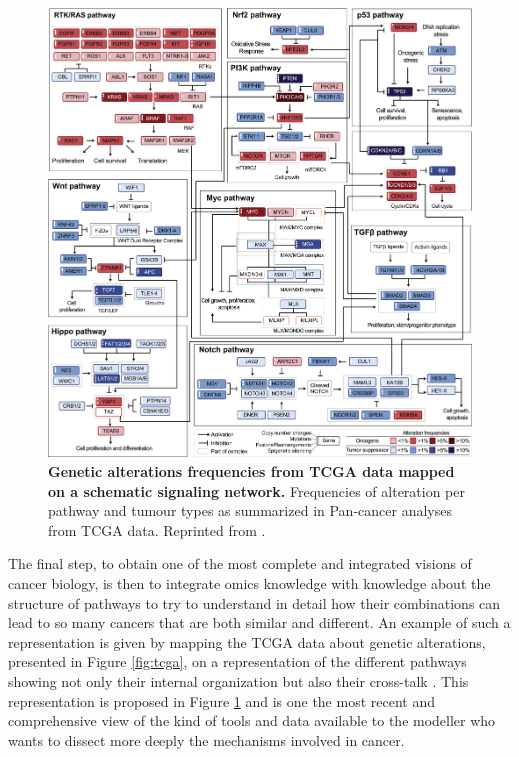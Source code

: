 \documentclass[a4paper,12pt,twoside,onecolumn,openright,final,oldfontcommands]{memoir}
\begin{document}
\begin{figure}

{\centering \includegraphics[width=0.9\linewidth]{fig/pathways} 

}

\caption[Genetic alterations frequencies from TCGA data mapped on a schematic signaling network]{\textbf{Genetic alterations frequencies from TCGA
data mapped on a schematic signaling network.} Frequencies of alteration
per pathway and tumour types as summarized in Pan-cancer analyses from
TCGA data. Reprinted from \citet{sanchez2018oncogenic}.}\label{fig:pathways}
\end{figure}






The final step, to obtain one of the most complete and integrated
visions of cancer biology, is then to integrate omics knowledge with
knowledge about the structure of pathways to try to understand in detail
how their combinations can lead to so many cancers that are both similar
and different. An example of such a representation is given by mapping
the TCGA data about genetic alterations, presented in Figure
\ref{fig:tcga}, on a representation of the different pathways showing
not only their internal organization but also their cross-talk
\citep{sanchez2018oncogenic}. This representation is proposed in Figure
\ref{fig:pathways} and is one the most recent and comprehensive view of
the kind of tools and data available to the modeller who wants to
dissect more deeply the mechanisms involved in cancer.
\end{document}
